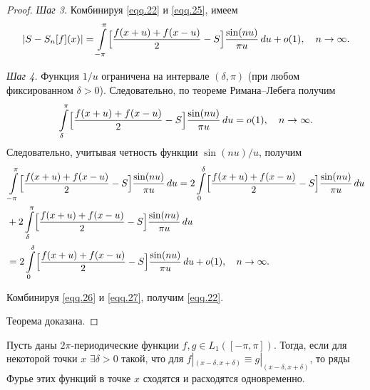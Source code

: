 \begin{proof}
\textit{Шаг 3.} Комбинируя \eqref{eqq.22} и \eqref{eqq.25}, имеем
\begin{equation}
	\label{eqq.26}
	|S-S_{n}[f](x)| = \int\limits_{-\pi}^{\pi}\Bigl[\frac{f(x+u)+f(x-u)}{2}-S\Bigr]\frac{\sin(nu)}{\pi u}\,du + o(1), \quad n \to \infty.
\end{equation}

\textit{Шаг 4.}  Функция $1/u$ ограничена на интервале $(\delta,\pi)$ (при любом фиксированном $\delta > 0$). Следовательно, по теореме Римана--Лебега получим
\begin{equation}
	\notag
	\int\limits_{\delta}^{\pi}\Bigl[\frac{f(x+u)+f(x-u)}{2}-S\Bigr]\frac{\sin(nu)}{\pi u}\,du = o(1), \quad n \to \infty.
\end{equation}
Следовательно, учитывая четность функции $\sin(nu)/u$, получим
\begin{equation}
	\label{eqq.27}
	\begin{split}
		&\int\limits_{-\pi}^{\pi}\Bigl[\frac{f(x+u)+f(x-u)}{2}-S\Bigr]\frac{\sin(nu)}{\pi u}\,du = 2\int\limits_{0}^{\delta}\Bigl[\frac{f(x+u)+f(x-u)}{2}-S\Bigr]\frac{\sin(nu)}{\pi u}\,du\\ 
		& + 2\int\limits_{\delta}^{\pi}\Bigl[\frac{f(x+u)+f(x-u)}{2}-S\Bigr]\frac{\sin(nu)}{\pi u}\,du\\ 
		&= 2\int\limits_{0}^{\delta}\Bigl[\frac{f(x+u)+f(x-u)}{2}-S\Bigr]\frac{\sin(nu)}{\pi u}\,du + o(1), \quad n \to \infty.
	\end{split}
\end{equation}

Комбинируя \eqref{eqq.26} и \eqref{eqq.27}, получим \eqref{eqq.22}.

Теорема доказана.
\end{proof}

\begin{corollary}
	Пусть даны $2\pi$-периодические функции $f, g \in L_1([-\pi, \pi])$. Тогда, если для некоторой точки $x$ $\exists \delta > 0$ такой, что для $f|_{(x - \delta, x + \delta)} \equiv g|_{(x - \delta, x + \delta)}$, то ряды Фурье этих функций в точке $x$ сходятся и расходятся одновременно.
\end{corollary}
